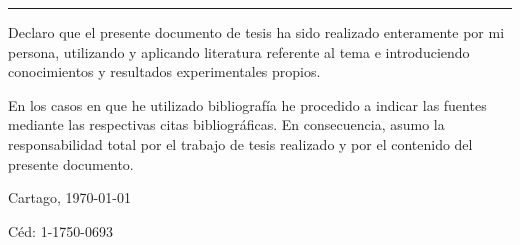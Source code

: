 \thispagestyle{empty}

\rule{10mm}{0pt}

\vfill

Declaro que el presente documento de tesis ha sido realizado enteramente
por mi persona, utilizando y aplicando literatura referente al tema e
introduciendo conocimientos y resultados experimentales propios.

En los casos en que he utilizado bibliografía he procedido a indicar las
fuentes mediante las respectivas citas bibliográficas.  En consecuencia,
asumo la responsabilidad total por el trabajo de tesis realizado y por
el contenido del presente documento.



\vspace*{8mm}

\begin{flushright}
  \thesisAuthor\par
  Cartago, \today\par
  Céd: 1-1750-0693
\end{flushright}

\cleardoublepage

